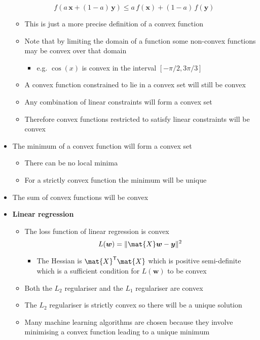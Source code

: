 \documentclass[11pt]{article}
\newcommand{\tr}{\textsf{T}}
\begin{document}
\begin{itemize}
 $$  f(a \,\bm{x} + (1-a)\, \bm{y}) \leq  a \, f(\bm{x}) + (1-a)  \, f(\bm{y}) $$
\begin{itemize}
\item This is just a more precise definition of a convex function
\item Note that by limiting the domain of a function some non-convex
functions may be convex over that domain
\begin{itemize}
\item e.g. \(\cos(x)\) is convex in the interval \([-\pi/2,3\pi/3]\)
\end{itemize}
\item A convex function constrained to lie in a convex set will still
be convex
\item Any combination of linear constraints will form a convex set
\item Therefore convex functions restricted to satisfy linear
constraints will be convex
\end{itemize}
\item The minimum of a convex function will form a convex set
\begin{itemize}
\item There can be no local minima
\item For a strictly convex function the minimum will be unique
\end{itemize}
\item The sum of convex functions will be convex
\item \textbf{Linear regression}
\begin{itemize}
\item The loss function of linear regression is convex
$$ L(\bm{w}) = \| \mat{X}\bm{w} - \bm{y} \|^2 $$
\begin{itemize}
\item The Hessian is \(\mat{X}^\tr\mat{X}\) which is positive
semi-definite which is a sufficient condition for \(L(\bm{w})\)
to be convex
\end{itemize}
\item Both the \(L_2\) regulariser and the \(L_1\) regulariser are convex
\item The \(L_2\) regulariser is strictly convex so there will be a
unique solution
\item Many machine learning algorithms are chosen because they
involve minimising a convex function leading to a unique minimum
\end{itemize}
\end{itemize}
\end{document}

